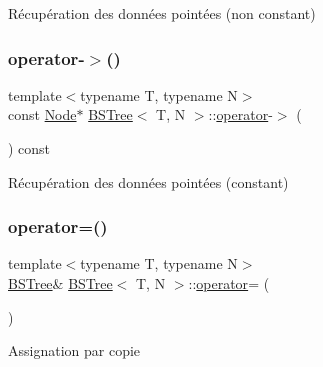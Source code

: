 Récupération des données pointées (non constant) \mbox{\label{classBSTree_a365c9985b08cb919c11dd91cdc3ef6ac}} 
\subsubsection{\texorpdfstring{operator-\/$>$()}{operator->()}\hspace{0.1cm}{\footnotesize\ttfamily [2/2]}}
{\footnotesize\ttfamily template$<$typename T, typename N$>$ \\
const \hyperlink{classBSTree_a9c1a06548b3ff425e1d906f17ce2c858}{Node}$\ast$ \hyperlink{classBSTree}{B\+S\+Tree}$<$ T, N $>$\+::\hyperlink{classBSTree_a1e8a7cc184833a959c0e8139756c22a7}{operator}-\/$>$ (\begin{DoxyParamCaption}{ }\end{DoxyParamCaption}) const\hspace{0.3cm}{\ttfamily [inline]}}

Récupération des données pointées (constant) \mbox{\label{classBSTree_ac28ab11cb87c12f7338d0f5e1194fb5f}} 
\subsubsection{\texorpdfstring{operator=()}{operator=()}\hspace{0.1cm}{\footnotesize\ttfamily [1/2]}}
{\footnotesize\ttfamily template$<$typename T, typename N$>$ \\
\hyperlink{classBSTree}{B\+S\+Tree}\& \hyperlink{classBSTree}{B\+S\+Tree}$<$ T, N $>$\+::\hyperlink{classBSTree_a1e8a7cc184833a959c0e8139756c22a7}{operator}= (\begin{DoxyParamCaption}\item[{const \hyperlink{classBSTree}{B\+S\+Tree}$<$ T, N $>$ \&}]{ }\end{DoxyParamCaption})\hspace{0.3cm}{\ttfamily [delete]}}

Assignation par copie \mbox{\label{classBSTree_a78c19a61f102ec3999ed62076651b9cb}} 
